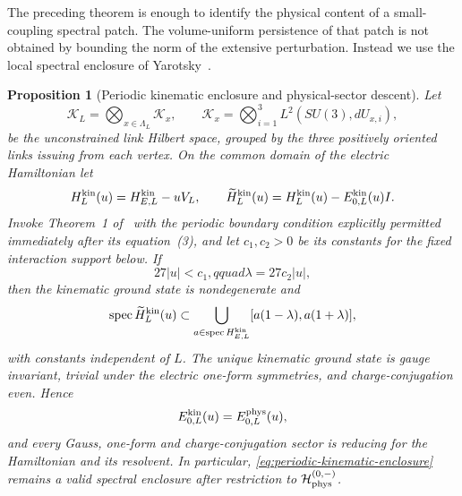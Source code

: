 \documentclass[11pt]{article}
\theoremstyle{plain}
\newtheorem{proposition}[theorem]{Proposition}
\theoremstyle{definition}
\theoremstyle{remark}
\begin{document}
The preceding theorem is enough to identify the physical content of a
small-coupling spectral patch. The volume-uniform persistence of that patch is
not obtained by bounding the norm of the extensive perturbation. Instead we
use the local spectral enclosure of Yarotsky~\cite{Yarotsky2004QP}.

\begin{proposition}[Periodic kinematic enclosure and physical-sector descent]
\label{prop:periodic-yarotsky-descent}
Let
\[
 \mathcal K_L=\bigotimes_{x\in\Lambda_L}\mathcal K_x,
 \qquad
 \mathcal K_x=\bigotimes_{i=1}^3L^2\!\left(SU(3),dU_{x,i}\right),
\]
be the unconstrained link Hilbert space, grouped by the three positively
oriented links issuing from each vertex.  On the common domain of the electric
Hamiltonian let
\[
 H_L^{\rm kin}(u)=H_{E,L}^{\rm kin}-uV_L,
 \qquad
 \widetilde H_L^{\rm kin}(u)
 =H_L^{\rm kin}(u)-E_{0,L}^{\rm kin}(u)I .
\]
Invoke Theorem~1 of~\cite{Yarotsky2004QP} with the periodic boundary
condition explicitly permitted immediately after its equation~(3), and let
$c_1,c_2>0$ be its constants for the fixed interaction support below.  If
\[
 27|u|<c_1,qquad \lambda=27c_2|u|,
\]
then the kinematic ground state is nondegenerate and
\begin{equation}\label{eq:periodic-kinematic-enclosure}
 \operatorname{spec}\widetilde H_L^{\rm kin}(u)
 \subset
 \bigcup_{a\in\operatorname{spec}H_{E,L}^{\rm kin}}
 [a(1-\lambda),a(1+\lambda)] ,
\end{equation}
with constants independent of $L$.  The unique kinematic ground state is
gauge invariant, trivial under the electric one-form symmetries, and
charge-conjugation even.  Hence
\[
 E_{0,L}^{\rm kin}(u)=E_{0,L}^{\rm phys}(u),
\]
and every Gauss, one-form and charge-conjugation sector is reducing for the
Hamiltonian and its resolvent.  In particular,
\eqref{eq:periodic-kinematic-enclosure} remains a valid spectral enclosure
after restriction to $\mathcal H_{\rm phys}^{(0,-)}$.
\end{proposition}
\end{document}

